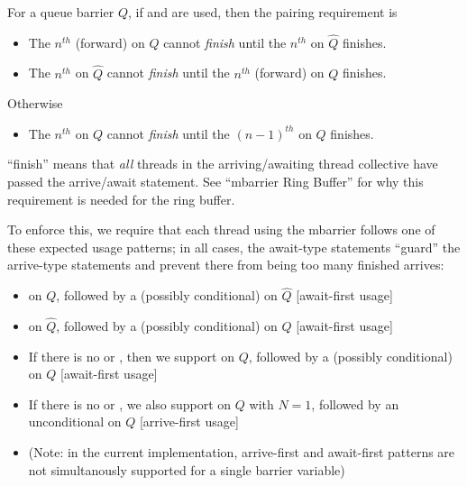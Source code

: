 For a  queue barrier $Q$, if  and  are used, then the pairing requirement is
\begin{itemize}
  \item The $n^{th}$ (forward)  on $Q$ cannot \textit{finish} until the $n^{th}$  on $\widehat{Q}$ finishes.
  \filbreak
  \item The $n^{th}$  on $\widehat{Q}$ cannot \textit{finish} until the $n^{th}$ (forward)  on $Q$ finishes.
\end{itemize}
\filbreak
Otherwise
\begin{itemize}
  \item The $n^{th}$  on $Q$ cannot \textit{finish} until the $(n-1)^{th}$  on $Q$ finishes.
\end{itemize}

\filbreak
``finish'' means that \textit{all} threads in the arriving/awaiting thread collective have passed the arrive/await statement.
See ``mbarrier Ring Buffer'' for why this requirement is needed for the ring buffer.

\filbreak
To enforce this, we require that each thread using the mbarrier follows one of these expected usage patterns; in all cases, the await-type statements ``guard'' the arrive-type statements and prevent there from being too many finished arrives:
\begin{itemize}
  \item {} on $Q$, followed by a (possibly conditional)  on $\widehat{Q}$ [await-first usage]
  \filbreak
  \item {} on $\widehat{Q}$, followed by a (possibly conditional)  on $Q$ [await-first usage]
  \filbreak
  \item If there is no  or , then we support  on $Q$, followed by a (possibly conditional)  on $Q$ [await-first usage]
  \filbreak
  \item If there is no  or , we also support  on $Q$ with $N=1$, followed by an unconditional  on $Q$ [arrive-first usage]
  \item (Note: in the current implementation, arrive-first and await-first patterns are not simultanously supported for a single barrier variable)
\end{itemize}


